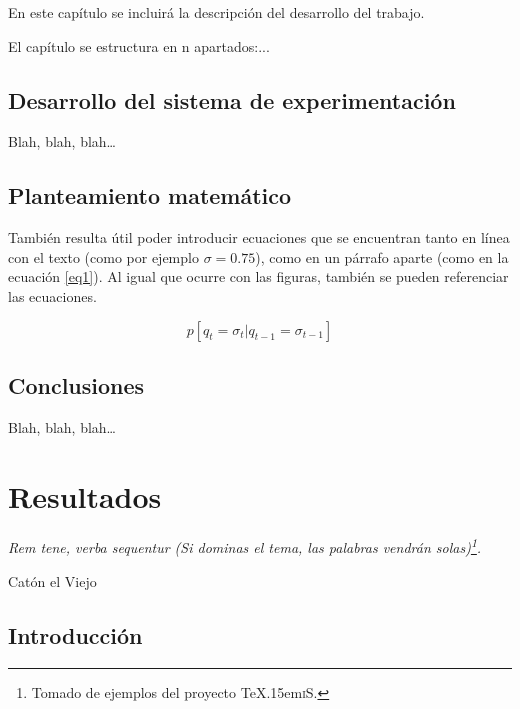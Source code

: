 \documentclass[spanish,openright]{book}
\def\texis{\TeX \raise.15em\hbox{\textsc{i}}S}
\newenvironment{FraseCelebre}{\begin{list}{}{\setlength{\leftmargin}{0.5\textwidth}\setlength{\parsep}{0cm}\addtolength{\topsep}{0.5cm}}
}
{\unskip \end{list}}
\newenvironment{Frase}{\item \begin{flushright}\small\em}{\end{flushright}}
\newenvironment{Fuente}{\item \begin{flushright}\small}{\end{flushright}}
\begin{document}
En este capítulo se incluirá la descripción del desarrollo del trabajo.

El capítulo se estructura en n apartados:...


\section{Desarrollo del sistema de experimentación}
\label{sec:desarr-del-sist}

Blah, blah, blah\ldots


\section{Planteamiento matemático}
\label{sec:libr-desarr}

También resulta útil poder introducir ecuaciones que se encuentran tanto
en línea con el texto (como por ejemplo $\sigma=0.75$), como en un
párrafo aparte (como en la ecuación \ref{eq1}). Al igual que ocurre con
las figuras, también se pueden referenciar las ecuaciones.

\begin{equation}
\label{eq1}
p[q_t=\sigma_t|q_{t-1}=\sigma_{t-1}]
\end{equation}

\section{Conclusiones}
\label{sec:conclusiones-desarrollo}

Blah, blah, blah\ldots






\chapter{Resultados}
\label{cha:resultados}


\begin{FraseCelebre}
\begin{Frase}
Rem tene, verba sequentur (Si dominas el tema, las palabras vendrán
solas)\footnote{Tomado de ejemplos del proyecto \texis{}.}.
\end{Frase}
\begin{Fuente}
Catón el Viejo
\end{Fuente}
\end{FraseCelebre}

\section{Introducción}
\label{sec:introduccion-resultados}
\end{document}
